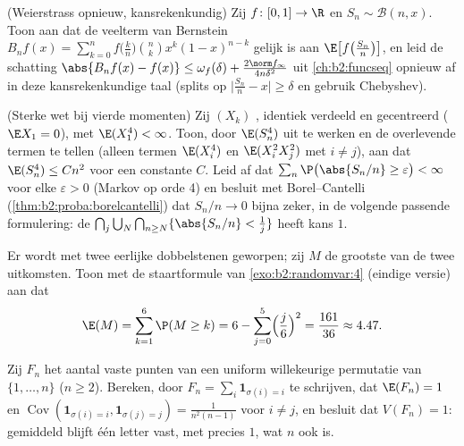\begin{exercise}[$\star\star\star$]\label{exo:b2:randomvar:8}
(Weierstrass opnieuw, kansrekenkundig) Zij $f \colon [0,1] \to \R$
 en $S_n \sim \mathcal{B}(n, x)$. Toon aan dat de veelterm
van Bernstein $B_nf(x) = \sum_{k=0}^n f\bigl(\frac kn\bigr)\binom
nk x^k(1-x)^{n-k}$ gelijk is aan
$\E\bigl[f\bigl(\frac{S_n}{n}\bigr)\bigr]$, en leid de schatting
$\abs{B_nf(x) - f(x)} \leq \omega_f(\delta) + \frac{2\norm
f_\infty}{4n\delta^2}$ uit \cref{ch:b2:funcseq} opnieuw af in deze
kansrekenkundige taal (splits op $\bigl|\frac{S_n}{n} - x\bigr|
\geq \delta$ en gebruik Chebyshev).
\end{exercise}

\begin{exercise}[$\star\star\star$]\label{exo:b2:randomvar:9}
(Sterke wet bij vierde momenten) Zij $(X_k)$ ,
identiek verdeeld en gecentreerd ($\E X_1 = 0$), met $\E(X_1^4) <
\infty$. Toon, door $\E(S_n^4)$ uit te werken en de overlevende
termen te tellen (alleen termen $\E(X_i^4)$ en $\E(X_i^2X_j^2)$ met
$i \neq j$), aan dat $\E(S_n^4) \leq C n^2$ voor een constante $C$.
Leid af dat $\sum_n \P\bigl(\abs{S_n/n} \geq \varepsilon\bigr) <
\infty$ voor elke $\varepsilon > 0$ (Markov op orde 4) en besluit
met Borel--Cantelli (\cref{thm:b2:proba:borelcantelli}) dat $S_n/n
\to 0$ bijna zeker, in de volgende passende formulering: de
 $\bigcap_{j}\bigcup_N\bigcap_{n \geq N}\{\abs{S_n/n} <
\frac1j\}$ heeft kans $1$.
\end{exercise}

\begin{exercise}[$\star$]\label{exo:b2:randomvar:10}
Er wordt met twee eerlijke dobbelstenen geworpen; zij $M$ de
grootste van de twee uitkomsten. Toon met de staartformule van
\cref{exo:b2:randomvar:4} (eindige versie) aan dat
\[
\E(M) = \sum_{k=1}^{6}\P(M \geq k)
= 6 - \sum_{j=0}^5\Bigl(\frac j6\Bigr)^2 = \frac{161}{36}
\approx 4.47 .
\]
\end{exercise}

\begin{exercise}[$\star\star$]\label{exo:b2:randomvar:11}
Zij $F_n$ het aantal vaste punten van een uniform willekeurige
permutatie van $\{1, \dots, n\}$ ($n \geq 2$). Bereken, door $F_n =
\sum_i\mathbf 1_{\sigma(i) = i}$ te schrijven, dat $\E(F_n) = 1$ en
$\operatorname{Cov}(\mathbf 1_{\sigma(i)=i}, \mathbf
1_{\sigma(j)=j}) = \frac1{n^2(n-1)}$ voor $i \neq j$, en besluit
dat $V(F_n) = 1$: gemiddeld blijft één letter vast, met 
precies $1$, wat $n$ ook is.
\end{exercise}

